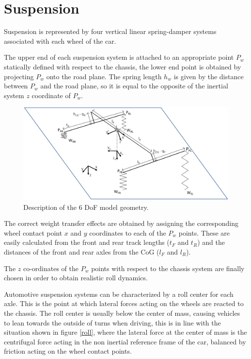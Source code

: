 \section{Suspension}
\label{sec:suspension}
Suspension is represented by four vertical linear spring-damper systems associated with each wheel of the car.

The upper end of each suspension system is attached to an appropriate point $P_w$ statically defined with respect to the chassis, the lower end point is obtained by projecting $P_w$ onto the road plane.
The spring length $h_w$ is given by the distance between $P_w$ and the road plane, so it is equal to the opposite of the inertial system $z$ coordinate of $P_w$.

\begin{figure}[ht]
  \centering
  \includegraphics[width=\textwidth]{images/3dview}
  \caption{Description of the 6 DoF model geometry.}
  \label{3dview}
\end{figure}

The correct weight transfer effects are obtained by assigning the corresponding wheel contact point $x$ and $y$ coordinates to each of the $P_w$ points. These are easily calculated from the front and rear track lengths ($t_F$ and $t_R$) and the distances of the front and rear axles from the CoG ($l_F$ and $l_R$).

The $z$ co-ordinates of the $P_w$ points with respect to the chassis system are finally chosen in order to obtain realistic roll dynamics.

Automotive suspension systems can be characterized by a roll center for each axle. This is the point at which lateral forces acting on the wheels are reacted to the chassis.
The roll center is usually below the center of mass, causing vehicles to lean towards the outside of turns when driving, this is in line with the situation shown in figure \ref{roll}, where the lateral force at the center of mass is the centrifugal force acting in the non inertial reference frame of the car, balanced by friction acting on the wheel contact points.

